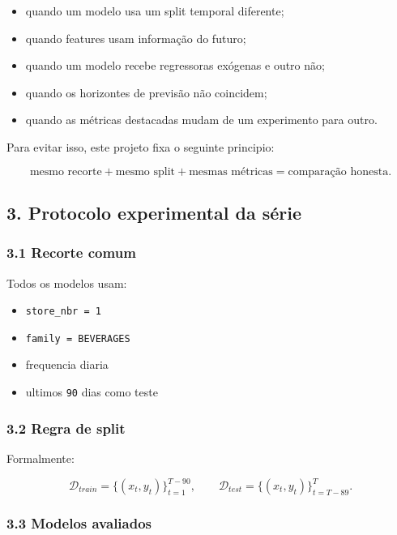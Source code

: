 \documentclass[12pt]{article}
\providecommand{\tightlist}{%
          \setlength{\itemsep}{0pt}\setlength{\parskip}{0pt}}
\begin{document}
\begin{itemize}
\tightlist
\item
  quando um modelo usa um split temporal diferente;
\item
  quando features usam informação do futuro;
\item
  quando um modelo recebe regressoras exógenas e outro não;
\item
  quando os horizontes de previsão não coincidem;
\item
  quando as métricas destacadas mudam de um experimento para outro.
\end{itemize}

Para evitar isso, este projeto fixa o seguinte principio:

\[
\text{mesmo recorte} + \text{mesmo split} + \text{mesmas métricas} = \text{comparação honesta}.
\]

\subsection{3. Protocolo experimental da série}\label{3-protocolo-experimental-da-suxe9rie}

\subsubsection{3.1 Recorte comum}\label{31-recorte-comum}

Todos os modelos usam:

\begin{itemize}
\tightlist
\item
  \texttt{store\_nbr\ =\ 1}
\item
  \texttt{family\ =\ BEVERAGES}
\item
  frequencia diaria
\item
  ultimos \texttt{90} dias como teste
\end{itemize}

\subsubsection{3.2 Regra de split}\label{32-regra-de-split}

Formalmente:

\[
\mathcal{D}_{train} = \{(x_t, y_t)\}_{t=1}^{T-90},
\qquad
\mathcal{D}_{test} = \{(x_t, y_t)\}_{t=T-89}^T.
\]

\subsubsection{3.3 Modelos avaliados}\label{33-modelos-avaliados}
\end{document}
